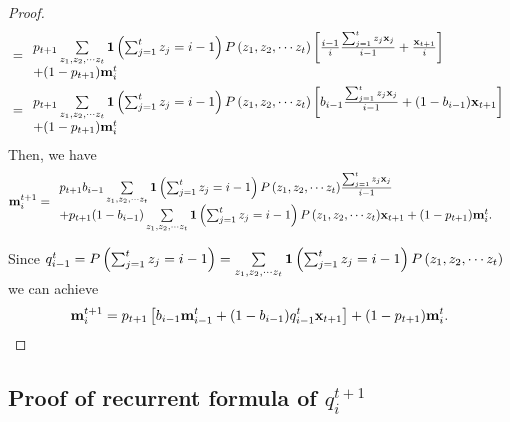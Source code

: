 \documentclass{article} \usepackage{iclr2019_conference,times}
\begin{document}
\begin{proof}
\begin{align}
  & = \begin{array}{l}
{p_{t + 1}}\sum\limits_{{z_1},{z_2}, \cdots {z_t}} {{\bf{1}}\left( {\sum\nolimits_{j = 1}^t {{z_j} = i - 1} } \right)P\left( {{z_1},{z_2}, \cdots {z_t}} \right)\left[ {\frac{{i - 1}}{i}\frac{{\sum\nolimits_{j = 1}^t {{z_j}{{\bf{x}}_j}} }}{{i - 1}} + \frac{{{{\bf{x}}_{t + 1}}}}{i}} \right]} \\
 + (1 - {p_{t + 1}}){\bf{m}}_i^t
\end{array} \\
  & =  \begin{array}{l}
{p_{t + 1}}\sum\limits_{{z_1},{z_2}, \cdots {z_t}} {{\bf{1}}\left( {\sum\nolimits_{j = 1}^t {{z_j} = i - 1} } \right)P\left( {{z_1},{z_2}, \cdots {z_t}} \right)\left[ {{b_{i - 1}}\frac{{\sum\nolimits_{j = 1}^t {{z_j}{{\bf{x}}_j}} }}{{i - 1}} + (1 - {b_{i - 1}}){{\bf{x}}_{t + 1}}} \right]} \\
 + (1 - {p_{t + 1}}){\bf{m}}_i^t
\end{array}
   \end{align}
Then, we have 
\begin{align}
{\bf m}^{t+1}_i & = \begin{array}{l}
{p_{t + 1}}{b_{i - 1}}\sum\limits_{{z_1},{z_2},\cdots{z_t}} {{\bf{1}}\left( {\sum\nolimits_{j = 1}^t {{z_j} = i - 1} } \right)P\left( {{z_1},{z_2},\cdots{z_t}} \right)} \frac{{\sum\nolimits_{j = 1}^t {{z_j}{{\bf x}_j}} }}{{i - 1}}\\  +
{p_{t + 1}}(1 - {b_{i - 1}})\sum\limits_{{z_1},{z_2},\cdots{z_t}} {{\bf{1}}\left( {\sum\nolimits_{j = 1}^t {{z_j} = i - 1} } \right)P\left( {{z_1},{z_2},\cdots{z_t}} \right)} {{\bf x}_{t + 1}} + (1 - {p_{t + 1}}) {\bf m}_i^t.
\end{array} \end{align}

Since  $q_{i-1}^t = P\left( {\sum\nolimits_{j = 1}^t {{z_j}}  = i-1} \right) = \sum\limits_{{z_1},{z_2},\cdots{z_t}} {{\bf{1}}\left( {\sum\nolimits_{j = 1}^t {{z_j} = i - 1} } \right)P\left( {{z_1},{z_2},\cdots{z_t}} \right)}$
we can achieve
\begin{align}
{\bf m}^{t+1}_i =  {p_{t + 1}}\left[ {{b_{i - 1}}{\bf m}_{i - 1}^t + (1 - {b_{i - 1}})q_{i - 1}^t{{\bf x}_{t + 1}}} \right] + (1 - {p_{t + 1}}){\bf m}_i^t.
\end{align}

\end{proof}

\subsection{Proof of recurrent formula of $q^{t+1}_i$}
\end{document}
